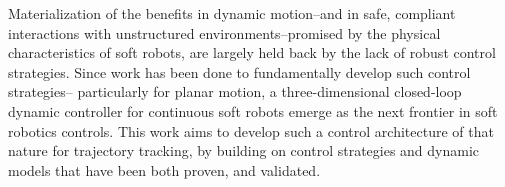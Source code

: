 Materialization of the benefits in dynamic motion--and in safe, compliant interactions with unstructured 
environments--promised by the physical characteristics of soft robots, are largely held back by the lack of 
robust control strategies. Since work has been done to fundamentally develop such control strategies--
particularly for planar motion, a three-dimensional closed-loop dynamic controller for continuous soft robots
emerge as the next frontier in soft robotics controls. This work aims to develop such a control architecture 
of that nature for trajectory tracking, by building on control strategies and dynamic models that have been 
both proven, and validated.